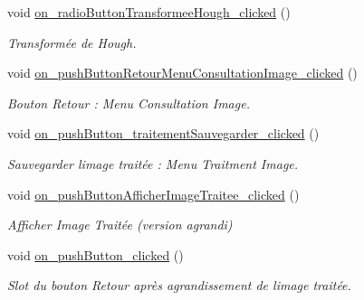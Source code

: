 \begin{DoxyCompactItemize}
\mbox{\label{classMainWindow_a04343ce587aba1572cac5247e6a27816}} 
void \hyperlink{classMainWindow_a04343ce587aba1572cac5247e6a27816}{on\+\_\+radio\+Button\+Transformee\+Hough\+\_\+clicked} ()
\begin{DoxyCompactList}\small\item\em Transformée de Hough. \end{DoxyCompactList}\item 
\mbox{\label{classMainWindow_ad2834e748144af0bfad4218e0b324eeb}} 
void \hyperlink{classMainWindow_ad2834e748144af0bfad4218e0b324eeb}{on\+\_\+push\+Button\+Retour\+Menu\+Consultation\+Image\+\_\+clicked} ()
\begin{DoxyCompactList}\small\item\em Bouton Retour \+: Menu Consultation Image. \end{DoxyCompactList}\item 
\mbox{\label{classMainWindow_a6469f0c600cec5c950ce8e6ea6ea8b30}} 
void \hyperlink{classMainWindow_a6469f0c600cec5c950ce8e6ea6ea8b30}{on\+\_\+push\+Button\+\_\+traitement\+Sauvegarder\+\_\+clicked} ()
\begin{DoxyCompactList}\small\item\em Sauvegarder l\textquotesingle{}image traitée \+: Menu Traitment Image. \end{DoxyCompactList}\item 
\mbox{\label{classMainWindow_ae4205e696ff8a01767c88add581c4067}} 
void \hyperlink{classMainWindow_ae4205e696ff8a01767c88add581c4067}{on\+\_\+push\+Button\+Afficher\+Image\+Traitee\+\_\+clicked} ()
\begin{DoxyCompactList}\small\item\em Afficher Image Traitée (version agrandi) \end{DoxyCompactList}\item 
\mbox{\label{classMainWindow_a4de79c63c7fa0b8d7c468ac71f20be81}} 
void \hyperlink{classMainWindow_a4de79c63c7fa0b8d7c468ac71f20be81}{on\+\_\+push\+Button\+\_\+clicked} ()
\begin{DoxyCompactList}\small\item\em Slot du bouton Retour après agrandissement de l\textquotesingle{}image traitée. \end{DoxyCompactList}\item 

\end{DoxyCompactItemize}
